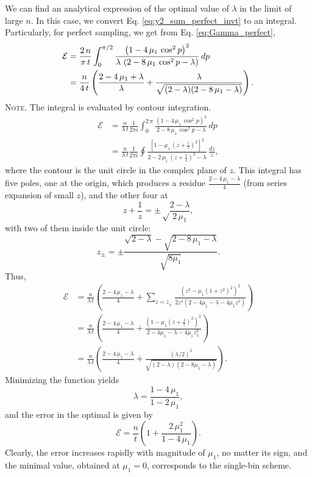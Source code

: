 \documentclass[reprint]{revtex4-1}
\newcommand{\note}[1]{{\color{DarkGreen}\footnotesize \textsc{Note.} #1}}
\begin{document}
We can find an analytical expression
of the optimal value of $\lambda$
in the limit of large $n$.
%
In this case,
we convert Eq.
\eqref{eq:y2_sum_perfect_invt}
to an integral.
%
Particularly,
for perfect sampling,
we get from Eq. \eqref{eq:Gamma_perfect},
$$
\begin{aligned}
\mathcal E
&=
\frac{2 \, n}{\pi \, t}
\int_0^{\pi/2}
\frac{ \left(1 - 4 \, \mu_1 \, \cos^2 p \right)^2 }
{ \lambda \, \left(2 - 8 \, \mu_1 \, \cos^2 p - \lambda \right) }
\, dp
\notag \\
&=
\frac{n}{4 \, t}
\left(
  \frac{2 - 4 \, \mu_1 + \lambda}{ \lambda }
  +
  \frac{ \lambda }
  { \sqrt{ (2 - \lambda) (2 - 8 \, \mu_1 - \lambda) } }
\right).
\end{aligned}
$$
\note{The integral is evaluated by contour integration.
$$
\begin{aligned}
\mathcal E
&=
\frac{n}{\lambda \, t}
\frac{1}{2 \pi i}
\int_0^{2 \, \pi}
\frac{ \left(1 - 4 \, \mu_1 \, \cos^2 p \right)^2 }
{ 2 - 8 \, \mu_1 \, \cos^2 p - \lambda }
\, dp
\\
&=
\frac{n}{\lambda \, t}
\frac{1}{2 \pi i}
\oint
\frac{ \left[1 - \mu_1 \, \left(z+\frac{1}{z}\right)^2 \right]^2 }
{ 2 - 2 \, \mu_1 \, \left(z + \frac{1}{z}\right)^2 - \lambda }
\, \frac{dz}{z},
\end{aligned}
$$
where the contour is the unit circle
in the complex plane of $z$.
%
This integral has five poles, one at the origin,
which produces a residue $\frac{2 - 4 \, \mu_1 - \lambda}{4}$
(from series expansion of small $z$),
and the other four at
$$
z + \frac{1}{z} = \pm\sqrt\frac{2-\lambda}{2 \, \mu_1},
$$
with two of them inside the unit circle:
$$
z_\pm = \pm \frac{\sqrt{2-\lambda} -\sqrt{2 - 8 \, \mu_1 - \lambda}}
{\sqrt{8 \mu_1}}.
$$
Thus,
$$
\begin{aligned}
  \mathcal E
&=
\frac{n}{\lambda \, t}
\left(
 \frac{2 - 4 \, \mu_1 - \lambda}{4}
 +
 \sum_{z = z_{\pm} }
 \frac{ \left(z^2 - \mu_1 (1 + z^2)^2 \right)^2 }
 { 2 z^4 (2 - 4 \mu_1 - \lambda - 4 \mu_1 z^2) }
\right)
\\
&=
\frac{n}{\lambda \, t}
\left(
  \frac{2 - 4 \, \mu_1 - \lambda}{4}
 +
 \frac{ \left(1 - \mu_1 \left(z + \frac{1}{z} \right)^2 \right)^2 }
 { 2 - 4 \mu_1 - \lambda - 4 \mu_1 z_{\pm}^2 }
\right)
\\
&=
\frac{n}{\lambda \, t}
\left(
  \frac{2 - 4 \, \mu_1 - \lambda}{4}
 +
 \frac{ (\lambda/2)^2 }
 { \sqrt{(2-\lambda) (2 - 8 \mu_1 -\lambda)} }
\right).
\end{aligned}
$$
}
%
Minimizing the function yields
%
\begin{equation}
\lambda = \frac{1 - 4 \, \mu_1} { 1 - 2 \, \mu_1 },
\label{eq:lambda_tridiag}
\end{equation}
%
and the error in the optimal is given by
%
\begin{equation}
\mathcal E
=
\frac{n}{t}
\left(
  1+ \frac{2 \, \mu_1^2}{1-4 \, \mu_1}
\right).
\label{eq:error_tridiag}
\end{equation}
%
Clearly, the error
increases rapidly with magnitude of $\mu_1$,
no matter its sign,
and the minimal value, obtained at $\mu_1 = 0$,
corresponds to the single-bin scheme.
\end{document}
